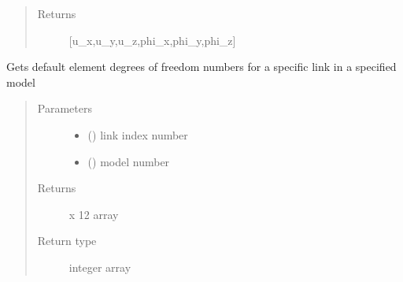 \documentclass[letterpaper,10pt,english]{sphinxmanual}
\begin{document}
\begin{fulllineitems}
\begin{fulllineitems}
\begin{quote}
\begin{description}
\item[{Returns}] \leavevmode
{[}u\_x,u\_y,u\_z,phi\_x,phi\_y,phi\_z{]}

\end{description}\end{quote}

\end{fulllineitems}


\begin{fulllineitems}
\label{\detokenize{api:beamon.database.database.Database.get_default_edof}}
Gets default element degrees of freedom numbers for a specific link in a specified model
\begin{quote}\begin{description}
\item[{Parameters}] \leavevmode\begin{itemize}
\item {} 
 () \textendash{} link index number

\item {} 
 () \textendash{} model number

\end{itemize}

\item[{Returns}]  x 12 array

\item[{Return type}] \leavevmode
integer array

\end{description}\end{quote}

\end{fulllineitems}



\end{fulllineitems}
\end{document}
